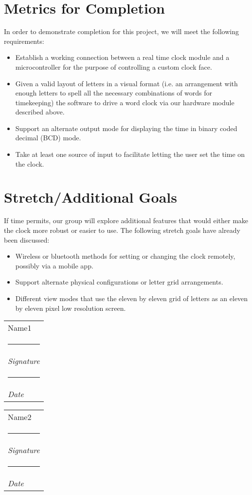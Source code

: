 \documentclass[10pt,draftclsnofoot,onecolumn]{IEEEtran}
\makeatletter
\newcommand{\namesigdate}[2][5cm]{%
  \begin{tabular}{@{}p{#1}@{}}
    #2 \\[2\normalbaselineskip] \hrule \\[0pt]
    {\small \textit{Signature}} \\[2\normalbaselineskip] \hrule \\[0pt]
    {\small \textit{Date}}
  \end{tabular}
}
\makeatother
\begin{document}
\section{Metrics for Completion}
In order to demonstrate completion for this project, we will meet the following requirements:
\begin{itemize}
  \item Establish a working connection between a real time clock module and a
  microcontroller for the purpose of controlling a custom clock face.
  \item Given a valid layout of letters in a visual format (i.e. an arrangement
  with enough letters to spell all the necessary combinations of words for
  timekeeping) the software to drive a word clock via our hardware module
  described above.
  \item Support an alternate output mode for displaying the time in binary coded
  decimal (BCD) mode.
  \item Take at least one source of input to facilitate letting the user set the
  time on the clock.
\end{itemize}

\section{Stretch/Additional Goals}
If time permits, our group will explore additional features that would either
make the clock more robust or easier to use. The following stretch goals have
already been discussed:
\begin{itemize}
  \item Wireless or bluetooth methods for setting or changing the clock remotely,
  possibly via a mobile app.
  \item Support alternate physical configurations or letter grid arrangements.
  \item Different view modes that use the eleven by eleven grid of letters as an
  eleven by eleven pixel low resolution screen.
\end{itemize}

\newpage

\noindent \namesigdate{Name1} \hfill \namesigdate[3cm]{Name2}
\end{document}
